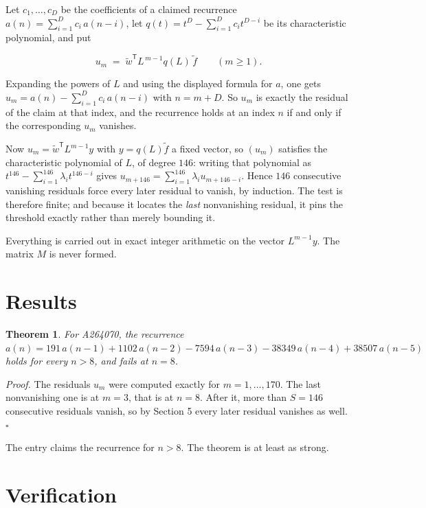 \documentclass[11pt]{article}
\newtheorem{theorem}{Theorem}
\theoremstyle{definition}
\begin{document}
Let $c_1,\dots,c_D$ be the coefficients of a claimed recurrence $a(n) = \sum_{i=1}^{D} c_i\,a(n-i)$, let $q(t) = t^{D} - \sum_{i=1}^{D} c_i t^{D-i}$ be its characteristic polynomial, and put

\[u_m \;=\; \tilde w^{\mathsf T} L^{\,m-1} q(L)\,\tilde f \qquad (m \ge 1).\]

Expanding the powers of $L$ and using the displayed formula for $a$, one gets $u_m = a(n) - \sum_{i=1}^{D} c_i\,a(n-i)$ with $n = m + D$. So $u_m$ is exactly the residual of the claim at that index, and the recurrence holds at an index $n$ if and only if the corresponding $u_m$ vanishes.

Now $u_m = \tilde w^{\mathsf T} L^{m-1} y$ with $y = q(L)\tilde f$ a fixed vector, so $(u_m)$ satisfies the characteristic polynomial of $L$, of degree $146$: writing that polynomial as $t^{146} - \sum_{i=1}^{146} \lambda_i t^{146-i}$ gives $u_{m+146} = \sum_{i=1}^{146} \lambda_i u_{m+146-i}$. Hence $146$ consecutive vanishing residuals force every later residual to vanish, by induction. The test is therefore finite; and because it locates the {\itshape last} nonvanishing residual, it pins the threshold exactly rather than merely bounding it.

Everything is carried out in exact integer arithmetic on the vector $L^{m-1}y$. The matrix $M$ is never formed.

\section{Results}

\begin{theorem} For A264070, the recurrence $a(n) = 191\,a(n-1) + 1102\,a(n-2) - 7594\,a(n-3) - 38349\,a(n-4) + 38507\,a(n-5)$ holds for every $n > 8$, and fails at $n = 8$.\end{theorem}

{\itshape Proof.} The residuals $u_m$ were computed exactly for $m = 1,\dots,170$. The last nonvanishing one is at $m = 3$, that is at $n = 8$. After it, more than $S = 146$ consecutive residuals vanish, so by Section 5 every later residual vanishes as well. $\square$

The entry claims the recurrence for $n > 8$. The theorem is at least as strong.

\section{Verification}
\end{document}
